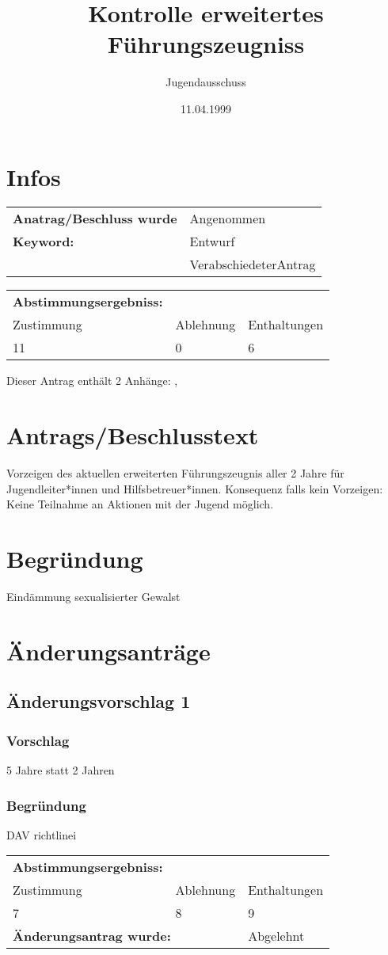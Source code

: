 \documentclass[12pt,a4paper,draft]{scrartcl}
\begin{document}
\title{Kontrolle erweitertes Führungszeugniss}
\author{Jugendausschuss}
\date{11.04.1999}
\maketitle
\section{Infos}
\begin{tabularx}{\linewidth}{@{}lX}
\textbf{Anatrag/Beschluss wurde} & Angenommen\\
\textbf{Keyword:} & Entwurf\\
 & VerabschiedeterAntrag\\
\end{tabularx}
\begin{tabularx}{\linewidth}{@{}XXX}
\textbf{Abstimmungsergebniss:}&&\\
Zustimmung & Ablehnung & Enthaltungen \\
11 & 0 & 6 \\
\end{tabularx}\vspace{1.5ex} 
 Dieser Antrag enthält 2 Anhänge: ,  
\section{Antrags/Beschlusstext}
Vorzeigen des aktuellen erweiterten Führungszeugnis aller 2 Jahre für Jugendleiter*innen und Hilfsbetreuer*innen. Konsequenz falls kein Vorzeigen: Keine Teilnahme an Aktionen mit der Jugend möglich.
\section{Begründung}
Eindämmung sexualisierter Gewalst
\section{Änderungsanträge}
\subsection{Änderungsvorschlag 1}
\subsubsection*{Vorschlag}
5 Jahre statt 2 Jahren
\subsubsection*{Begründung}
DAV richtlinei\vspace{1.5ex} \\
\begin{tabularx}{\linewidth}{@{}XXX}
\textbf{Abstimmungsergebniss:}&&\\
Zustimmung & Ablehnung & Enthaltungen \\
7 & 8 & 9 \\
\multicolumn{2}{l}{\textbf{Änderungsantrag wurde:}} & Abgelehnt \\
\end{tabularx}
\end{document}
